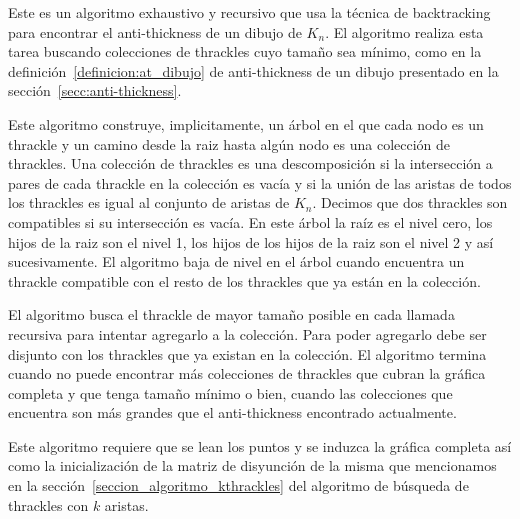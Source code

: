   Este es un algoritmo exhaustivo y recursivo que usa la técnica de backtracking para encontrar el
  anti-thickness de un dibujo de $K_n$. El algoritmo realiza esta tarea buscando colecciones de thrackles
  cuyo tamaño sea mínimo, como en la definición~\ref{definicion:at_dibujo} de anti-thickness de un dibujo
  presentado en la sección~\ref{secc:anti-thickness}.

  Este algoritmo construye, implicitamente, un árbol en el que cada nodo es un thrackle y un camino desde
  la raiz hasta algún nodo es una colección de thrackles. Una colección de thrackles es una descomposición
  si la intersección a pares de cada thrackle en la colección es vacía y si la unión de las aristas de
  todos los thrackles es igual al conjunto de aristas de $K_n$. Decimos que dos thrackles son compatibles
  si su intersección es vacía. En este árbol la raíz es el nivel cero, los hijos de la raiz son el nivel 1,
  los hijos de los hijos de la raiz son el nivel 2 y así sucesivamente. El algoritmo baja de nivel en el
  árbol cuando encuentra un thrackle compatible con el resto de los thrackles que ya están en la colección.

  El algoritmo busca el thrackle de mayor tamaño posible en cada llamada recursiva para intentar agregarlo
  a la colección. Para poder agregarlo debe ser disjunto con los thrackles que ya existan en la colección.
  El algoritmo termina cuando no puede encontrar más colecciones de thrackles que cubran la gráfica
  completa y que tenga tamaño mínimo o bien, cuando las colecciones que encuentra son más grandes que el
  anti-thickness encontrado actualmente.

  Este algoritmo requiere que se lean los puntos y se induzca la gráfica completa así como la inicialización
  de la matriz de disyunción de la misma que mencionamos en la sección~\ref{seccion_algoritmo_kthrackles}
  del algoritmo de búsqueda de thrackles con $k$ aristas.

